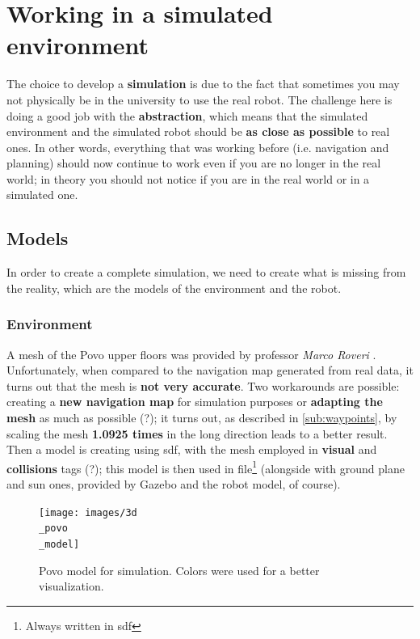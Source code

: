 \chapter{Working in a simulated environment}

The choice to develop a \textbf{simulation} is due to the fact that sometimes you may not physically be in the university to use the real robot. The challenge here is doing a good job with the \textbf{abstraction}, which means that the simulated environment and the simulated robot should be \textbf{as close as possible} to real ones. In other words, everything that was working before (i.e. navigation and planning) should now continue to work even if you are no longer in the real world; in theory you should not notice if you are in the real world or in a simulated one.

\section{Models}

In order to create a complete simulation, we need to create what is missing from the reality, which are the models of the environment and the robot.

\subsection{Environment}
\label{sub:map}

A mesh of the Povo upper floors was provided by professor \textit{Marco Roveri} \cite{roveri}. Unfortunately, when compared to the navigation map generated from real data, it turns out that the mesh is \textbf{not very accurate}. Two workarounds are possible: creating a \textbf{new navigation map} for simulation purposes or \textbf{adapting the mesh} as much as possible (?); it turns out, as described in \autoref{sub:waypoints}, by scaling the mesh \textbf{1.0925 times} in the long direction leads to a better result. %
Then a model is creating using \acrfull{sdf}, with the mesh employed in \textbf{visual} and \textbf{collisions} tags (?); this model is then used in  file\footnote{Always written in \acrshort{sdf}} (alongside with ground plane and sun ones, provided by Gazebo and the robot model, of course).

\begin{figure}[h]
    \centering
    \texttt{[image: images/3d\\\_povo\\\_model]}
    \caption{Povo model for simulation. Colors were used for a better visualization.}
\end{figure}

